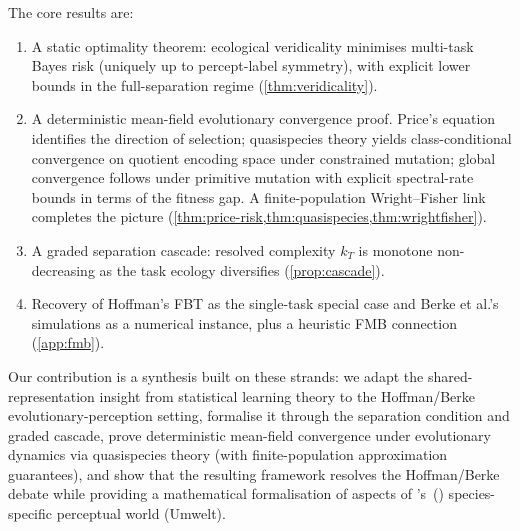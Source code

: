 \documentclass[12pt]{article}
\begin{document}
The core results are:
\begin{enumerate}[label=(\roman*),leftmargin=*]
\item A static optimality theorem: ecological veridicality minimises multi-task Bayes risk (uniquely up to percept-label symmetry), with explicit lower bounds in the full-separation regime (\cref{thm:veridicality}).
\item A deterministic mean-field evolutionary convergence proof. Price's equation identifies the direction of selection; quasispecies theory yields class-conditional convergence on quotient encoding space under constrained mutation; global convergence follows under primitive mutation with explicit spectral-rate bounds in terms of the fitness gap. A finite-population Wright--Fisher link completes the picture (\cref{thm:price-risk,thm:quasispecies,thm:wrightfisher}).
\item A graded separation cascade: resolved complexity $k_T$ is monotone non-decreasing as the task ecology diversifies (\cref{prop:cascade}).
\item Recovery of Hoffman's FBT as the single-task special case and Berke et al.'s simulations as a numerical instance, plus a heuristic FMB connection (\cref{app:fmb}).
\end{enumerate}

Our contribution is a synthesis built on these strands: we adapt the shared-representation insight from statistical learning theory \citep{baxter_2000,maurer_etal_2016} to the Hoffman/Berke evolutionary-perception setting, formalise it through the separation condition and graded cascade, prove deterministic mean-field convergence under evolutionary dynamics via quasispecies theory (with finite-population approximation guarantees), and show that the resulting framework resolves the Hoffman/Berke debate while providing a mathematical formalisation of aspects of \citeauthor{vonuexkull_1934}'s~(\citeyear{vonuexkull_1934}) species-specific perceptual world (Umwelt).
\end{document}
